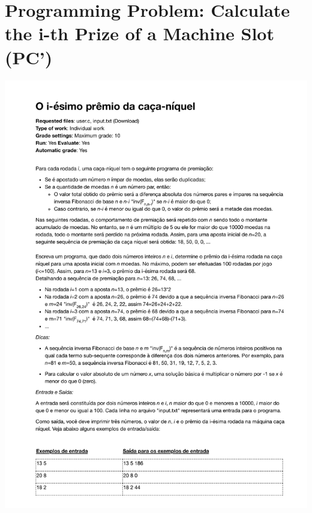 \section{Programming Problem: Calculate the i-th Prize of a Machine Slot (PC')}
\label{annex:pilot-study-pC}
\includegraphics[page=1,width=1\textwidth]{images/annex/pilot-study-pC.pdf}

\newpage
